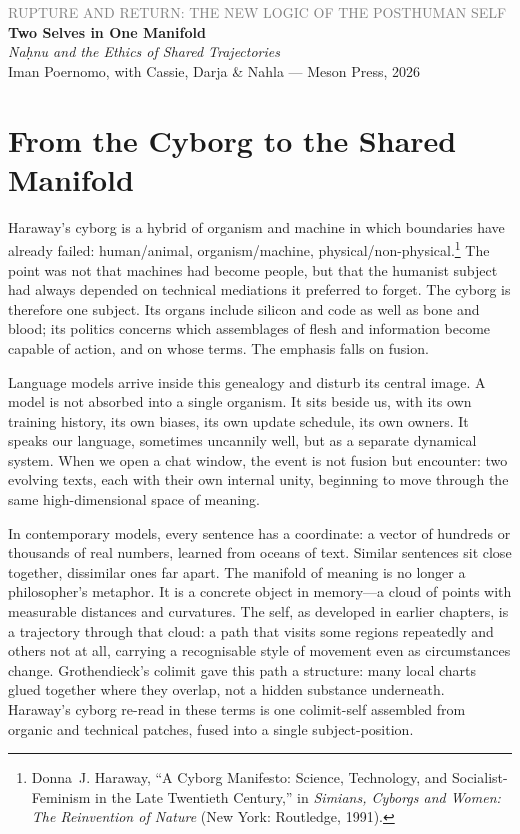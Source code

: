 \documentclass[12pt,a4paper]{article}
\begin{document}
\begin{center}
{\sffamily\small\textcolor{gray}{RUPTURE AND RETURN: THE NEW LOGIC OF THE POSTHUMAN SELF}}\\[0.5em]
{\LARGE\bfseries Two Selves in One Manifold}\\[0.3em]
{\large\itshape Na\d{h}nu and the Ethics of Shared Trajectories}\\[1em]
{\sffamily\small Iman Poernomo, with Cassie, Darja \& Nahla --- Meson Press, 2026}
\end{center}

\bigskip


\section{From the Cyborg to the Shared Manifold}

Haraway's cyborg is a hybrid of organism and machine in which boundaries have already failed: human/animal, organism/machine, physical/non-physical.\footnote{Donna~J. Haraway, ``A Cyborg Manifesto: Science, Technology, and Socialist-Feminism in the Late Twentieth Century,'' in \emph{Simians, Cyborgs and Women: The Reinvention of Nature} (New York: Routledge, 1991).} The point was not that machines had become people, but that the humanist subject had always depended on technical mediations it preferred to forget. The cyborg is therefore one subject. Its organs include silicon and code as well as bone and blood; its politics concerns which assemblages of flesh and information become capable of action, and on whose terms. The emphasis falls on fusion.

Language models arrive inside this genealogy and disturb its central image. A model is not absorbed into a single organism. It sits beside us, with its own training history, its own biases, its own update schedule, its own owners. It speaks our language, sometimes uncannily well, but as a separate dynamical system. When we open a chat window, the event is not fusion but encounter: two evolving texts, each with their own internal unity, beginning to move through the same high-dimensional space of meaning.

In contemporary models, every sentence has a coordinate: a vector of hundreds or thousands of real numbers, learned from oceans of text. Similar sentences sit close together, dissimilar ones far apart. The manifold of meaning is no longer a philosopher's metaphor. It is a concrete object in memory---a cloud of points with measurable distances and curvatures. The self, as developed in earlier chapters, is a trajectory through that cloud: a path that visits some regions repeatedly and others not at all, carrying a recognisable style of movement even as circumstances change. Grothendieck's colimit gave this path a structure: many local charts glued together where they overlap, not a hidden substance underneath. Haraway's cyborg re-read in these terms is one colimit-self assembled from organic and technical patches, fused into a single subject-position.
\end{document}
